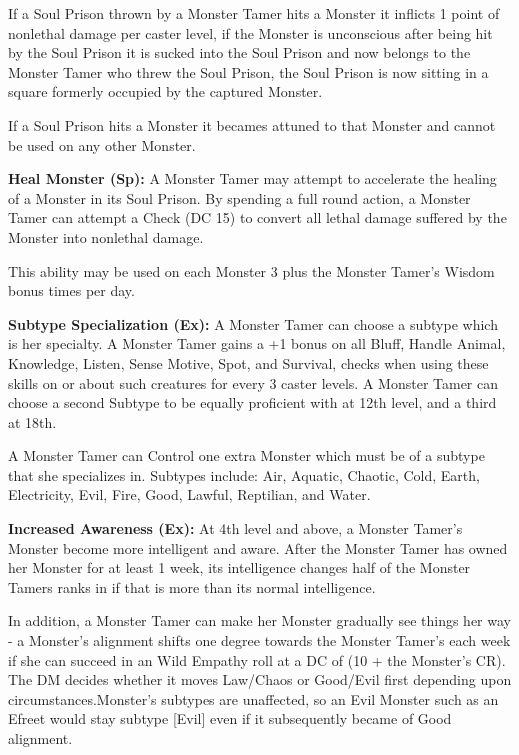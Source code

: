 If a Soul Prison thrown by a Monster Tamer hits a Monster it inflicts 1 point of nonlethal damage per caster level, if the Monster is unconscious after being hit by the Soul Prison it is sucked into the Soul Prison and now belongs to the Monster Tamer who threw the Soul Prison, the Soul Prison is now sitting in a square formerly occupied by the captured Monster.

If a Soul Prison hits a Monster it becames attuned to that Monster and cannot be used on any other Monster.

\textbf{Heal Monster (Sp):} A Monster Tamer may attempt to accelerate the healing of a Monster in its Soul Prison. By spending a full round action, a Monster Tamer can attempt a  Check (DC 15) to convert all lethal damage suffered by the Monster into nonlethal damage.

This ability may be used on each Monster 3 plus the Monster Tamer's Wisdom bonus times per day.

\textbf{Subtype Specialization (Ex):} A Monster Tamer can choose a subtype which is her specialty. A Monster Tamer gains a +1 bonus on
all Bluff, Handle Animal, Knowledge, Listen, Sense Motive, Spot, and Survival, checks when using these skills on
or about such creatures for every 3 caster levels. A Monster Tamer can choose a second Subtype to be equally proficient with at 12th level, and a third at 18th.

A Monster Tamer can Control one extra Monster which must be of a subtype that she specializes in. Subtypes include: Air, Aquatic, Chaotic, Cold, Earth, Electricity, Evil, Fire, Good, Lawful, Reptilian, and Water.

\textbf{Increased Awareness (Ex):} At 4th level and above, a Monster Tamer's Monster become more intelligent and aware. After the
Monster Tamer has owned her Monster for at least 1 week, its intelligence changes half of the Monster Tamers ranks in  if that is more than its normal intelligence.

In addition, a Monster Tamer can make her Monster gradually see things her way - a Monster's alignment shifts one degree towards the Monster Tamer's each week if she can succeed in an Wild Empathy roll at a DC of (10 + the Monster's CR). The DM decides whether it moves Law/Chaos or Good/Evil first depending upon circumstances.Monster's subtypes are unaffected, so an Evil Monster such as an Efreet would stay subtype [Evil] even if it subsequently became of Good alignment.

